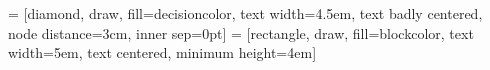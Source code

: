 \usetikzlibrary{shapes.geometric}


 = [diamond, draw, fill=decisioncolor, 
    text width=4.5em, text badly centered, node distance=3cm,
    inner sep=0pt]
 = [rectangle, draw, fill=blockcolor, 
    text width=5em, text centered, minimum height=4em]